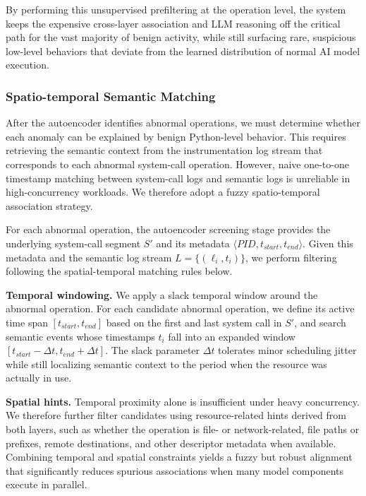 By performing this unsupervised prefiltering at the operation level, the system keeps the expensive cross-layer association and LLM reasoning off the critical path for the vast majority of benign activity, while still surfacing rare, suspicious low-level behaviors that deviate from the learned distribution of normal AI model execution.

\subsubsection{Spatio-temporal Semantic Matching}

After the autoencoder identifies abnormal operations, we must determine whether each anomaly can be explained by benign Python-level behavior. This requires retrieving the semantic context from the instrumentation log stream that corresponds to each abnormal system-call operation. However, naive one-to-one timestamp matching between system-call logs and semantic logs is unreliable in high-concurrency workloads. We therefore adopt a fuzzy spatio-temporal association strategy.

For each abnormal operation, the autoencoder screening stage provides the underlying system-call segment $S'$ and its metadata $\langle \textit{PID}, t_{\textit{start}}, t_{\textit{end}} \rangle$. Given this metadata and the semantic log stream $L = \{(\ell_i, t_i)\}$, we perform filtering following the spatial-temporal matching rules below.

\noindent \textbf{Temporal windowing.}
We apply a slack temporal window around the abnormal operation. For each candidate abnormal operation, we define its active time span $[t_{\textit{start}}, t_{\textit{end}}]$ based on the first and last system call in $S'$, and search semantic events whose timestamps $t_i$ fall into an expanded window $[t_{\textit{start}} - \Delta t, t_{\textit{end}} + \Delta t]$. The slack parameter $\Delta t$ tolerates minor scheduling jitter while still localizing semantic context to the period when the resource was actually in use.

\noindent \textbf{Spatial hints.}
Temporal proximity alone is insufficient under heavy concurrency. We therefore further filter candidates using resource-related hints derived from both layers, such as whether the operation is file- or network-related, file paths or prefixes, remote destinations, and other descriptor metadata when available. Combining temporal and spatial constraints yields a fuzzy but robust alignment that significantly reduces spurious associations when many model components execute in parallel.

